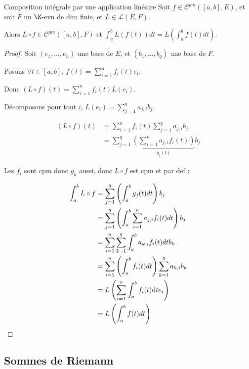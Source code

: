 \begin{theoreme}{Composition intégrale par une application linéaire}{}
    Soit $f \in \mathscr C^{pm}([a, b], E)$, et soit $F$ un $\K$-evn de dim finie, et 
    $L \in \mathscr L(E, F)$.

    Alors $L \circ f \in \mathscr C^{pm}([a, b], F)$ et $\displaystyle \int_a^b L(f(t)) dt = L\left( \int_a^b f(t) dt \right)$.
\end{theoreme}


\begin{proof}
    Soit $(e_1, \ldots, e_n)$ une base de $E$, et $(b_1, \ldots, b_q)$ une base de $F$.

    Posons $\displaystyle \forall t \in [a, b], \, f(t) = \sum_{i=1}^n f_i(t)e_i$.

    Donc $\displaystyle (L \circ f)(t) = \sum_{i=1}^n f_i(t)L(e_i)$.

    Décomposons pour tout $i$, $\displaystyle L(e_i) = \sum_{j=1}^q a_{j, i} b_j$.

    \begin{align*}
        (L \circ f) (t) & = \sum_{i=1}^n f_i(t) \sum_{j=1}^q a_{j, i} b_j \\
        & = \sum_{j=1}^q \underbrace{\left( \sum_{i=1}^n a_{j, i} f_i(t) \right)}_{g_j(t)} b_j
    \end{align*}

    Les $f_i$ sont cpm donc $g_k$ aussi, donc $L \circ f$ est cpm et par def : 

    \begin{align*}
        \int_a^b L \circ f & = \sum_{j=1}^q \left( \int_a^b g_j(t) dt \right) b_j \\
        & = \sum_{j=1}^q \left( \int_a^b \sum_{i=1}^n a_{j, i} f_i(t) dt \right) b_j \\
        & = \sum_{i = 1}^n \sum_{k = 1 }^{q } \int_{a }^{b } a_{k, i} f_i(t) dt b_k \\
        & = \sum_{i=1}^n \left( \int_a^b f_i(t) dt \right) \sum_{k=1}^q a_{k, i} b_k \\
        & = L \left( \sum_{i = 1 }^{n } \int_{a }^{b } f_i(t) \text d t e_i \right) \\
        & = L \left( \int_a^b f(t) dt \right)
    \end{align*}
\end{proof}

\subsection{Sommes de Riemann}

